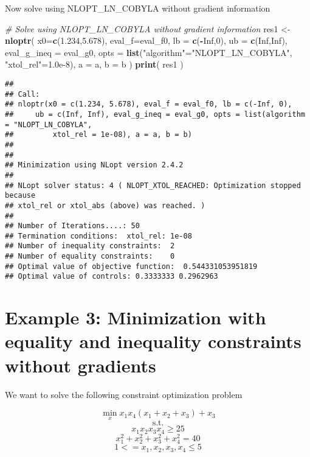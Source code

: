 \documentclass[onecolumn]{article}
\newenvironment{Shaded}{\begin{snugshade}}{\end{snugshade}}
\newcommand{\KeywordTok}[1]{\textcolor[rgb]{0.13,0.29,0.53}{\textbf{#1}}}
\newcommand{\DataTypeTok}[1]{\textcolor[rgb]{0.13,0.29,0.53}{#1}}
\newcommand{\DecValTok}[1]{\textcolor[rgb]{0.00,0.00,0.81}{#1}}
\newcommand{\FloatTok}[1]{\textcolor[rgb]{0.00,0.00,0.81}{#1}}
\newcommand{\StringTok}[1]{\textcolor[rgb]{0.31,0.60,0.02}{#1}}
\newcommand{\CommentTok}[1]{\textcolor[rgb]{0.56,0.35,0.01}{\textit{#1}}}
\newcommand{\OtherTok}[1]{\textcolor[rgb]{0.56,0.35,0.01}{#1}}
\newcommand{\OperatorTok}[1]{\textcolor[rgb]{0.81,0.36,0.00}{\textbf{#1}}}
\newcommand{\NormalTok}[1]{#1}
\begin{document}
Now solve using NLOPT\_LN\_COBYLA without gradient information

\begin{Shaded}
\begin{Highlighting}[]
\CommentTok{# Solve using NLOPT_LN_COBYLA without gradient information}
\NormalTok{res1 <-}\StringTok{ }\KeywordTok{nloptr}\NormalTok{( }\DataTypeTok{x0=}\KeywordTok{c}\NormalTok{(}\FloatTok{1.234}\NormalTok{,}\FloatTok{5.678}\NormalTok{),}
\DataTypeTok{eval_f=}\NormalTok{eval_f0,}
\DataTypeTok{lb =} \KeywordTok{c}\NormalTok{(}\OperatorTok{-}\OtherTok{Inf}\NormalTok{,}\DecValTok{0}\NormalTok{),}
\DataTypeTok{ub =} \KeywordTok{c}\NormalTok{(}\OtherTok{Inf}\NormalTok{,}\OtherTok{Inf}\NormalTok{),}
\DataTypeTok{eval_g_ineq =}\NormalTok{ eval_g0,}
\DataTypeTok{opts =} \KeywordTok{list}\NormalTok{(}\StringTok{"algorithm"}\NormalTok{=}\StringTok{"NLOPT_LN_COBYLA"}\NormalTok{,}
\StringTok{"xtol_rel"}\NormalTok{=}\FloatTok{1.0e-8}\NormalTok{),}
\DataTypeTok{a =}\NormalTok{ a,}
\DataTypeTok{b =}\NormalTok{ b )}
\KeywordTok{print}\NormalTok{( res1 )}
\end{Highlighting}
\end{Shaded}

\begin{verbatim}
## 
## Call:
## nloptr(x0 = c(1.234, 5.678), eval_f = eval_f0, lb = c(-Inf, 0), 
##     ub = c(Inf, Inf), eval_g_ineq = eval_g0, opts = list(algorithm = "NLOPT_LN_COBYLA", 
##         xtol_rel = 1e-08), a = a, b = b)
## 
## 
## Minimization using NLopt version 2.4.2 
## 
## NLopt solver status: 4 ( NLOPT_XTOL_REACHED: Optimization stopped because 
## xtol_rel or xtol_abs (above) was reached. )
## 
## Number of Iterations....: 50 
## Termination conditions:  xtol_rel: 1e-08 
## Number of inequality constraints:  2 
## Number of equality constraints:    0 
## Optimal value of objective function:  0.544331053951819 
## Optimal value of controls: 0.3333333 0.2962963
\end{verbatim}

\section{Example 3: Minimization with equality and inequality
constraints without
gradients}\label{example-3-minimization-with-equality-and-inequality-constraints-without-gradients}

We want to solve the following constraint optimization problem

\[
\min_{x} x_1 x_4(x_1 + x_2 + x_3) + x_3\]\[
\text{s.t.}\]\[
    x_1 x_2 x_3 x_4 \geq 25\]\[
    x_1^2 + x_2^2 + x_3^2 + x_4^2 = 40\]\[
    1 <= x_1,x_2,x_3,x_4 \leq 5
\]
\end{document}
